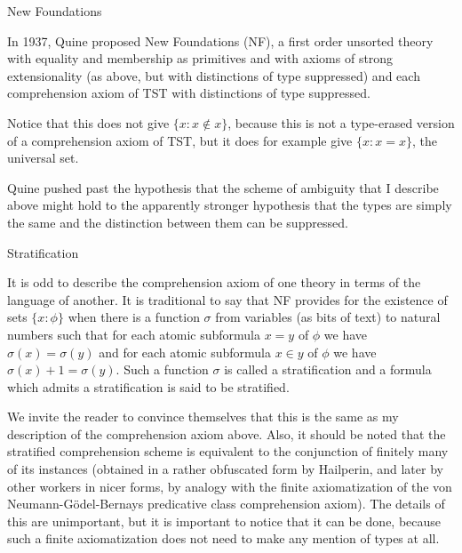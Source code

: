 \documentclass{slides}
\begin{document}
\begin{slide}

{\Large New Foundations}

In 1937, Quine proposed New Foundations (NF), a first order unsorted theory with equality and membership as primitives
and with axioms of strong extensionality (as above, but with distinctions of type suppressed) and each comprehension axiom of TST with distinctions of type suppressed.

Notice that this does not give $\{x:x \not\in x\}$, because this is not a type-erased version of a comprehension axiom of TST, but it does for example give $\{x:x=x\}$, the universal set.

Quine pushed past the hypothesis that the scheme of ambiguity that I describe above might hold to the apparently stronger hypothesis that the types are simply the same and the distinction between them can be suppressed.

\end{slide}

\begin{slide}

{\Large Stratification}

It is odd to describe the comprehension axiom of one theory in terms of the language of another.  It is traditional to say that NF
provides for the existence of sets $\{x:\phi\}$ when there is a function $\sigma$ from variables (as bits of text) to
natural numbers such that for each atomic subformula $x=y$ of $\phi$ we have $\sigma(x)=\sigma(y)$ and for each atomic subformula $x\in y$ of $\phi$ we have $\sigma(x)+1 = \sigma(y)$.  Such a function $\sigma$ is called a stratification and
a formula which admits a stratification is said to be stratified.

\end{slide}

\begin{slide}

We invite the reader to convince themselves that this is the same as my description of the comprehension axiom
above.  Also, it should be noted that the stratified comprehension scheme is equivalent to the conjunction of finitely many of its instances (obtained in a rather obfuscated form by Hailperin, and later by other workers in nicer forms, by analogy with the finite axiomatization of the von Neumann-G\"odel-Bernays predicative class comprehension axiom).  The details of this are unimportant, but it is important to notice that it can be done, because such a finite axiomatization does not need to make any mention of types at all.

\end{slide}
\end{document}

